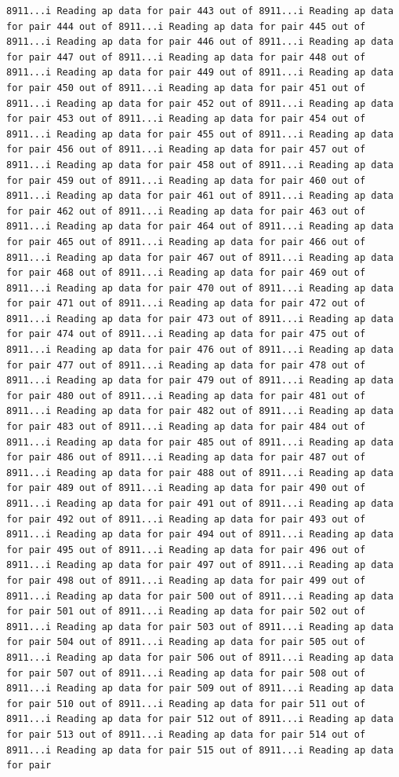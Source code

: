 \documentclass[
]{article}
\begin{document}
\begin{verbatim}
8911...i Reading ap data for pair 443 out of 8911...i Reading ap data for pair 444 out of 8911...i Reading ap data for pair 445 out of 8911...i Reading ap data for pair 446 out of 8911...i Reading ap data for pair 447 out of 8911...i Reading ap data for pair 448 out of 8911...i Reading ap data for pair 449 out of 8911...i Reading ap data for pair 450 out of 8911...i Reading ap data for pair 451 out of 8911...i Reading ap data for pair 452 out of 8911...i Reading ap data for pair 453 out of 8911...i Reading ap data for pair 454 out of 8911...i Reading ap data for pair 455 out of 8911...i Reading ap data for pair 456 out of 8911...i Reading ap data for pair 457 out of 8911...i Reading ap data for pair 458 out of 8911...i Reading ap data for pair 459 out of 8911...i Reading ap data for pair 460 out of 8911...i Reading ap data for pair 461 out of 8911...i Reading ap data for pair 462 out of 8911...i Reading ap data for pair 463 out of 8911...i Reading ap data for pair 464 out of 8911...i Reading ap data for pair 465 out of 8911...i Reading ap data for pair 466 out of 8911...i Reading ap data for pair 467 out of 8911...i Reading ap data for pair 468 out of 8911...i Reading ap data for pair 469 out of 8911...i Reading ap data for pair 470 out of 8911...i Reading ap data for pair 471 out of 8911...i Reading ap data for pair 472 out of 8911...i Reading ap data for pair 473 out of 8911...i Reading ap data for pair 474 out of 8911...i Reading ap data for pair 475 out of 8911...i Reading ap data for pair 476 out of 8911...i Reading ap data for pair 477 out of 8911...i Reading ap data for pair 478 out of 8911...i Reading ap data for pair 479 out of 8911...i Reading ap data for pair 480 out of 8911...i Reading ap data for pair 481 out of 8911...i Reading ap data for pair 482 out of 8911...i Reading ap data for pair 483 out of 8911...i Reading ap data for pair 484 out of 8911...i Reading ap data for pair 485 out of 8911...i Reading ap data for pair 486 out of 8911...i Reading ap data for pair 487 out of 8911...i Reading ap data for pair 488 out of 8911...i Reading ap data for pair 489 out of 8911...i Reading ap data for pair 490 out of 8911...i Reading ap data for pair 491 out of 8911...i Reading ap data for pair 492 out of 8911...i Reading ap data for pair 493 out of 8911...i Reading ap data for pair 494 out of 8911...i Reading ap data for pair 495 out of 8911...i Reading ap data for pair 496 out of 8911...i Reading ap data for pair 497 out of 8911...i Reading ap data for pair 498 out of 8911...i Reading ap data for pair 499 out of 8911...i Reading ap data for pair 500 out of 8911...i Reading ap data for pair 501 out of 8911...i Reading ap data for pair 502 out of 8911...i Reading ap data for pair 503 out of 8911...i Reading ap data for pair 504 out of 8911...i Reading ap data for pair 505 out of 8911...i Reading ap data for pair 506 out of 8911...i Reading ap data for pair 507 out of 8911...i Reading ap data for pair 508 out of 8911...i Reading ap data for pair 509 out of 8911...i Reading ap data for pair 510 out of 8911...i Reading ap data for pair 511 out of 8911...i Reading ap data for pair 512 out of 8911...i Reading ap data for pair 513 out of 8911...i Reading ap data for pair 514 out of 8911...i Reading ap data for pair 515 out of 8911...i Reading ap data for pair 
\end{verbatim}
\end{document}
